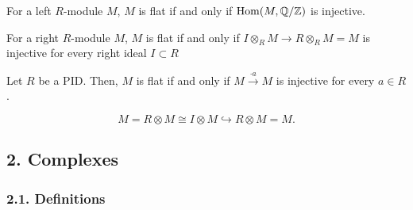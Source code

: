 \documentclass{../../small}
\begin{document}
\begin{cor*}[1.8.4]
For a left $R$-module $M$, $M$ is flat if and only if $\operatorname{Hom}(M,\mathbb{Q}/\mathbb{Z})$ is injective.
\end{cor*}

\begin{cor*}[1.8.5]
For a right $R$-module $M$, $M$ is flat if and only if $I\otimes_RM\to R\otimes_RM=M$ is injective for every right ideal $I\subset R$
\end{cor*}

\begin{cor*}[1.8.6]
Let $R$ be a PID.
Then, $M$ is flat if and only if $M\xrightarrow{\cdot a}M$ is injective for every $a\in R$.
\end{cor*}
\begin{pf}
\[M=R\otimes M\cong I\otimes M\hookrightarrow R\otimes M=M.\]
\end{pf}


\subsection*{2. Complexes}

\subsubsection*{2.1. Definitions}
\end{document}
